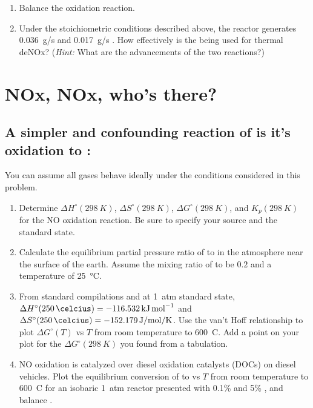 \documentclass[11pt]{article}
\begin{document}
\begin{center}
\end{center}
\begin{enumerate}
\item Balance the  oxidation reaction.

\item Under the stoichiometric conditions described above, the reactor generates \SI{0.036}{g/s}  and \SI{0.017}{g/s} . How effectively is the  being used for thermal deNOx? (\emph{Hint:} What are the advancements of the two reactions?)
\end{enumerate}

\section{NOx, NOx, who's there?}
\label{sec:orgb886fec}
\subsection{A simpler and confounding reaction of  is it's oxidation to :}
\label{sec:orgf2c41ea}
\begin{center}
\end{center}
\noindent You can assume all gases behave ideally under the conditions considered in this problem.

\begin{enumerate}
\item Determine  \(\Delta H^\circ (\SI{298}{K})\),  \(\Delta S^\circ (\SI{298}{K})\), \(\Delta G^\circ (\SI{298}{K})\), and  \(K_p (\SI{298}{K})\) for the NO oxidation reaction. Be sure to specify your source and the standard state.

\item Calculate the equilibrium partial pressure ratio of  to  in the atmosphere near the surface of the earth. Assume the mixing ratio of  to be \(0.2\) and a temperature of \SI{25}{\celsius}.

\item From standard compilations and at \SI{1}{atm} standard state, \(\Delta H^\circ (\SI{250}{\celcius}) = \SI{-116.532}{\kJ\per\mol}\) and \(\Delta S^\circ (\SI{250}{\celcius}) = \SI{-152.179}{J\per\mol\per\kelvin}\).  Use the van't Hoff relationship to plot \(\Delta G^\circ (T)\) vs \(T\) from room temperature to \SI{600}{C}. Add a point on your plot for the \(\Delta G^\circ (\SI{298}{K})\) you found from a tabulation.

\item NO oxidation is catalyzed over diesel oxidation catalysts (DOCs) on diesel vehicles. Plot the equilibrium conversion of  to  vs \(T\) from room temperature to \SI{600}{C} for an isobaric \SI{1}{atm} reactor presented with 0.1\%  and 5\% , and balance .
\end{enumerate}
\end{document}
